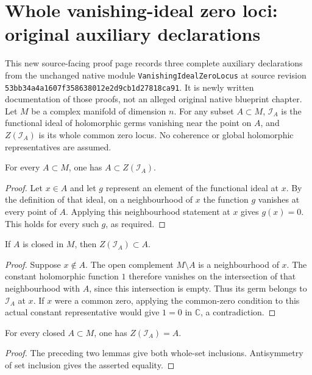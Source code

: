 \section{Whole vanishing-ideal zero loci: original auxiliary declarations}

This new source-facing proof page records three complete auxiliary declarations
from the unchanged native module \texttt{VanishingIdealZeroLocus} at source
revision \texttt{53bb34a4a1607f358638012e2d9cb1d27818ca91}. It is newly written
documentation of those proofs, not an alleged original native blueprint
chapter. Let $M$ be a complex manifold of dimension $n$. For any subset
$A\subset M$, $\mathcal I_A$ is the functional ideal of holomorphic germs
vanishing near the point on $A$, and $Z(\mathcal I_A)$ is its whole common zero
locus. No coherence or global holomorphic representatives are assumed.

\begin{lemma}
\label{pub:vanishing-zero-locus-subset}
\leanok
For every $A\subset M$, one has $A\subset Z(\mathcal I_A)$.
\end{lemma}
\begin{proof}
Let $x\in A$ and let $g$ represent an element of the functional ideal at $x$.
By the definition of that ideal, on a neighbourhood of $x$ the function $g$
vanishes at every point of $A$. Applying this neighbourhood statement at $x$
gives $g(x)=0$. This holds for every such $g$, as required.
\end{proof}

\begin{lemma}
\label{pub:vanishing-zero-locus-reverse}
\leanok
If $A$ is closed in $M$, then $Z(\mathcal I_A)\subset A$.
\end{lemma}
\begin{proof}
Suppose $x\notin A$. The open complement $M\setminus A$ is a neighbourhood
of $x$. The constant holomorphic function $1$ therefore vanishes on the
intersection of that neighbourhood with $A$, since this intersection is empty.
Thus its germ belongs to $\mathcal I_A$ at $x$. If $x$ were a common zero,
applying the common-zero condition to this actual constant representative
would give $1=0$ in $\mathbb C$, a contradiction.
\end{proof}

\begin{theorem}
\label{pub:vanishing-zero-locus-whole}
\leanok
For every closed $A\subset M$, one has $Z(\mathcal I_A)=A$.
\end{theorem}
\begin{proof}
The preceding two lemmas give both whole-set inclusions. Antisymmetry of set
inclusion gives the asserted equality.
\end{proof}
